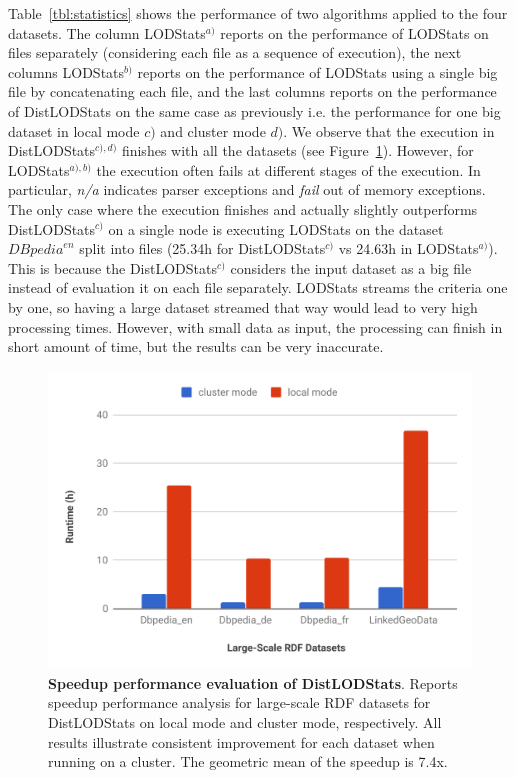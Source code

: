 Table~\ref{tbl:statistics} shows the performance of two algorithms applied to the four datasets.
The column LODStats$^{a)}$ reports on the performance of LODStats on files separately (considering each file as a sequence of execution), the next columns LODStats$^{b)}$ reports on the performance of LODStats using a single big file by concatenating each file, and the last columns reports on the performance of DistLODStats on the same case as previously i.e. the performance for one big dataset in local mode $c)$ and cluster mode $d)$.
We observe that the execution in DistLODStats$^{c), d)}$ finishes with all the datasets (see Figure~\ref{fig:Speedup}).
However, for LODStats$^{a), b)}$ the execution often fails at different stages of the execution.
In particular, \emph{n/a} indicates parser exceptions and \emph{fail} out of memory exceptions.
The only case where the execution finishes and actually slightly outperforms DistLODStats$^{c)}$ on a single node is executing LODStats on the dataset ${DBpedia}^{en}$ split into files (25.34h for DistLODStats$^{c)}$ vs 24.63h in LODStats$^{a)}$). 
This is because the DistLODStats$^{c)}$ considers the input dataset as a big file instead of evaluation it on each file separately. 
LODStats streams the criteria one by one, so having a large dataset streamed that way would lead to very high processing times.
However, with small data as input, the processing can finish in short amount of time, but the results can be very inaccurate.

\begin{figure}
  \includegraphics[width=1.0\columnwidth]{images/4_distlodstats/distlodstats-speedup-performance.pdf}
    \caption{\textbf{Speedup performance evaluation of DistLODStats}. Reports speedup performance analysis for large-scale RDF datasets for DistLODStats on local mode and cluster mode, respectively. All results illustrate consistent improvement for each dataset when running on a cluster. The geometric mean of the speedup is 7.4x.}
    \label{fig:Speedup}
\end{figure}

